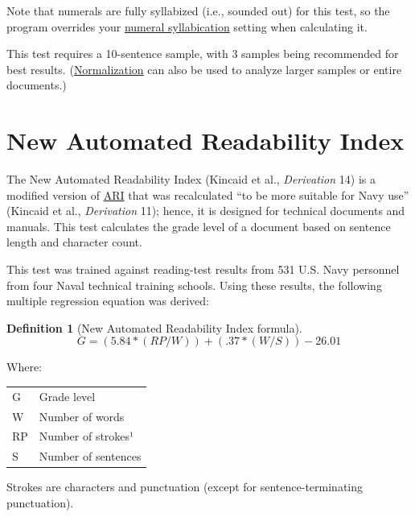 \documentclass[
]{book}
\theoremstyle{definition}
\newtheorem{definition}{Definition}[chapter]
\theoremstyle{definition}
\theoremstyle{definition}
\theoremstyle{definition}
\theoremstyle{remark}
\begin{document}
Note that numerals are fully syllabized (i.e., sounded out) for this test, so the program overrides your \protect\hyperlink{numsyllable}{numeral syllabication} setting when calculating it.

This test requires a 10-sentence sample, with 3 samples being recommended for best results. (\protect\hyperlink{glossary}{Normalization} can also be used to analyze larger samples or entire documents.)

\newpage

\hypertarget{new-ari}{%
\section{\texorpdfstring{New Automated Readability Index}{New Automated Readability Index}}\label{new-ari}}

The New Automated Readability Index (Kincaid et al., \emph{Derivation} 14) is a modified version of \protect\hyperlink{ari-test}{ARI} that was recalculated ``to be more suitable for Navy use'' (Kincaid et al., \emph{Derivation} 11); hence, it is designed for technical documents and manuals. This test calculates the grade level of a document based on sentence length and character count.

This test was trained against reading-test results from 531 U.S. Navy personnel from four Naval technical training schools. Using these results, the following multiple regression equation was derived:

\begin{definition}[New Automated Readability Index formula]
\protect\hypertarget{def:newari}{}{\label{def:newari} {} }\[
G = (5.84*(RP/W)) + (.37*(W/S)) - 26.01
\]
\end{definition}

Where:

\begin{table}
\centering
\begin{threeparttable}
\begin{tabular}[t]{l>{\raggedright\arraybackslash}p{10cm}}
\toprule
G & Grade level\\
W & Number of words\\
RP & Number of strokes¹\\
S & Number of sentences\\
\bottomrule
\end{tabular}
\begin{tablenotes}
\item[1] Strokes are characters and punctuation (except for sentence-terminating punctuation).
\end{tablenotes}
\end{threeparttable}
\end{table}
\end{document}
